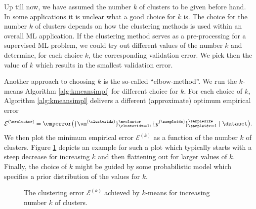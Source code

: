 \documentclass[12pt]{report}
\begin{document}
Up till now, we have assumed the number $k$ of clusters 
to be given before hand. In some applications it is unclear
what a good choice for $k$ is. The choice for the number 
$k$ of clusters depends on how the clustering methods is 
used within an overall ML application. If the clustering method 
serves as a pre-processing for a supervised ML problem, we 
could try out different values of the number $k$ and determine, 
for each choice $k$, the corresponding validation error. We 
pick then the value of $k$ which results in the smallest validation error. 

Another approach to choosing $k$ is the so-called ``elbow-method''. 
We run the $k$-means Algorithm \ref{alg:kmeansimpl} for different choice 
for $k$. For each choice of $k$, Algorithm \ref{alg:kmeansimpl} delivers a 
different (approximate) optimum empirical error $$\mathcal{E}^{(\nrcluster)} = \emperror \big( \{\vm^{(\clusteridx)}\}_{\clusteridx=1}^{\nrcluster},\{y^{(\sampleidx)}\}_{\sampleidx=1}^{\samplesize} \mid \dataset \big).$$ 
We then plot the minimum empirical error $\mathcal{E}^{(k)}$ as a 
function of the number $k$ of clusters. Figure \ref{fig_ellbow} depicts 
an example for such a plot which typically starts with a steep decrease 
for increasing $k$ and then flattening out for larger values of $k$. 
Finally, the choice of $k$ might be guided by some probabilistic 
model which specifies a prior distribution of the values for $k$. 


\begin{figure}
\begin{center}
\end{center}
\caption{The clustering error $\mathcal{E}^{(k)}$ achieved by $k$-means for increasing number $k$ of clusters.}
\label{fig_ellbow}
\end{figure}
\end{document}
